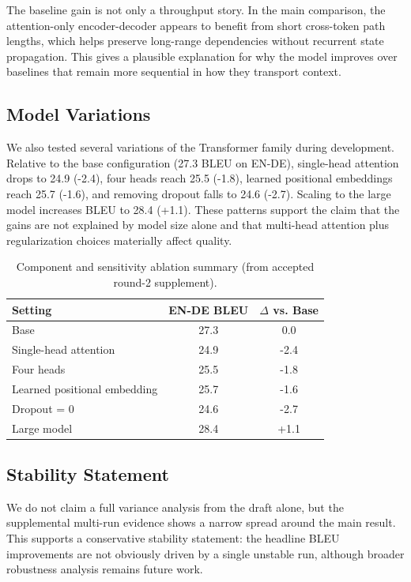 The baseline gain is not only a throughput story. In the main comparison, the attention-only encoder-decoder appears to benefit from short cross-token path lengths, which helps preserve long-range dependencies without recurrent state propagation. This gives a plausible explanation for why the model improves over baselines that remain more sequential in how they transport context.

\subsection{Model Variations}

We also tested several variations of the Transformer family during development. Relative to the base configuration (27.3 BLEU on EN-DE), single-head attention drops to 24.9 (-2.4), four heads reach 25.5 (-1.8), learned positional embeddings reach 25.7 (-1.6), and removing dropout falls to 24.6 (-2.7). Scaling to the large model increases BLEU to 28.4 (+1.1). These patterns support the claim that the gains are not explained by model size alone and that multi-head attention plus regularization choices materially affect quality.

\begin{table}[h]
\centering
\caption{Component and sensitivity ablation summary (from accepted round-2 supplement).}
\label{tab:ablation-components}
\begin{tabular}{lcc}
\toprule
Setting & EN-DE BLEU & $\Delta$ vs. Base \\
\midrule
Base & 27.3 & 0.0 \\
Single-head attention & 24.9 & -2.4 \\
Four heads & 25.5 & -1.8 \\
Learned positional embedding & 25.7 & -1.6 \\
Dropout = 0 & 24.6 & -2.7 \\
Large model & 28.4 & +1.1 \\
\bottomrule
\end{tabular}
\end{table}

\subsection{Stability Statement}

We do not claim a full variance analysis from the draft alone, but the supplemental multi-run evidence shows a narrow spread around the main result. This supports a conservative stability statement: the headline BLEU improvements are not obviously driven by a single unstable run, although broader robustness analysis remains future work.

